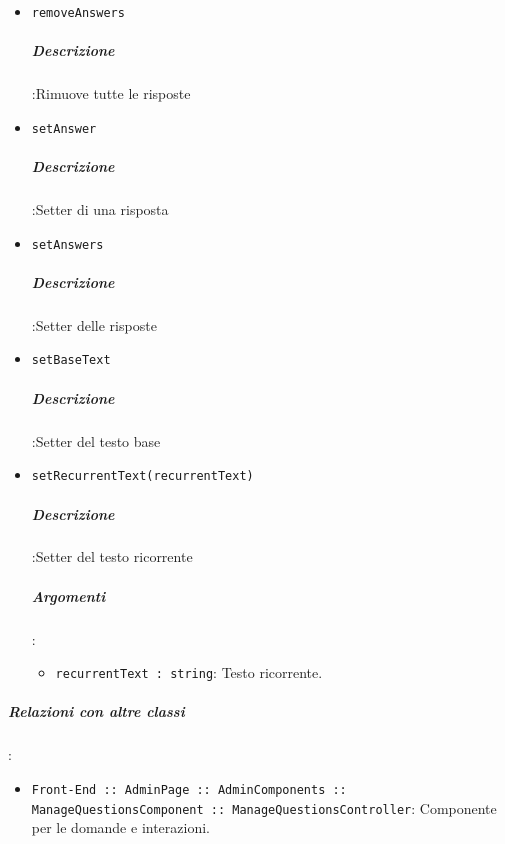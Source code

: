 \documentclass[../ManualeSviluppatore_v2.0.0.tex]{subfiles}
\begin{document}
\begin{itemize}
		      	\item \texttt{removeAnswers}
		      	      \subparagraph{Descrizione}:Rimuove tutte le risposte

		      	\item \texttt{setAnswer}
		      	      \subparagraph{Descrizione}:Setter di una risposta

		      	\item \texttt{setAnswers}
		      	      \subparagraph{Descrizione}:Setter delle risposte

		      	\item \texttt{setBaseText}
		      	      \subparagraph{Descrizione}:Setter del testo base

		      	\item \texttt{setRecurrentText(recurrentText)}
		      	      \subparagraph{Descrizione}:Setter del testo ricorrente
					\subparagraph{Argomenti}:
						\begin{itemize}
							\item \texttt{recurrentText : string}:
								Testo ricorrente.
						\end{itemize}
		      \end{itemize}\vspace{0.5em}
		\subparagraph{Relazioni con altre classi}:
		      \begin{itemize}
		      	\item \texttt{Front-End :: AdminPage :: AdminComponents :: ManageQuestionsComponent :: ManageQuestionsController}: Componente per le domande e interazioni.
		      \end{itemize}
\end{document}
